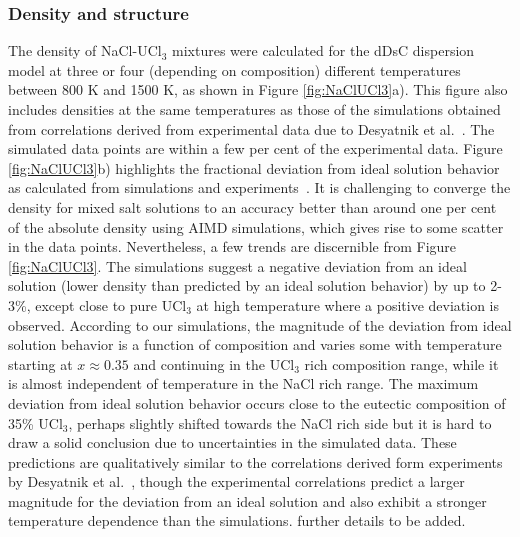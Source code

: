 \documentclass[preprint,3p,10pt,onecolumn,number,sort&compress]{elsarticle}
\begin{document}
\subsubsection{Density and structure}
The density of NaCl-UCl$_3$ mixtures were calculated for the dDsC dispersion model at three or four (depending on composition) different temperatures between 800 K and 1500 K, as shown in Figure \ref{fig:NaClUCl3}a). This figure also includes densities at the same temperatures as those of the simulations obtained from correlations derived from experimental data due to Desyatnik et al.~\cite{Desyatnik}. The simulated data points are within a few per cent of the experimental data.  %
Figure \ref{fig:NaClUCl3}b) highlights the fractional deviation from ideal solution behavior as calculated from simulations and experiments~\cite{Desyatnik}. 
It is challenging to converge the density for mixed salt solutions to an accuracy better than around one per cent of the absolute density using AIMD simulations, which gives rise to some scatter in the data points. 
Nevertheless, a few trends are discernible from Figure \ref{fig:NaClUCl3}. %
The simulations suggest a negative deviation from an ideal solution (lower density than predicted by an ideal solution behavior) by up to 2-3\%, except close to pure UCl$_3$ at high temperature where a positive deviation is observed. According to our simulations, the magnitude of the deviation from ideal solution behavior is a function of composition and varies some with temperature starting at $x\approx0.35$ and continuing in the UCl$_3$ rich composition range, while it is almost independent of temperature in the NaCl rich range. 
The maximum deviation from ideal solution behavior occurs close to the eutectic composition of 35\% UCl$_3$, perhaps slightly shifted towards the NaCl rich side but it is hard to draw a solid conclusion due to uncertainties in the simulated data. These predictions are qualitatively similar to the correlations derived form experiments by Desyatnik et al.~\cite{Desyatnik}, though the experimental correlations predict a larger magnitude for the deviation from an ideal solution and also exhibit a stronger temperature dependence than the simulations. {\color{red} further details to be added.} %
\end{document}
